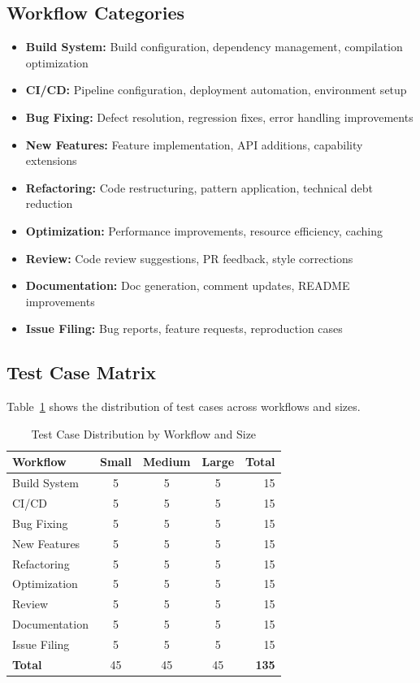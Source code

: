 \documentclass[11pt]{article}
\begin{document}
\subsection{Workflow Categories}
\begin{itemize}
    \item \textbf{Build System:} Build configuration, dependency management, compilation optimization
    \item \textbf{CI/CD:} Pipeline configuration, deployment automation, environment setup
    \item \textbf{Bug Fixing:} Defect resolution, regression fixes, error handling improvements
    \item \textbf{New Features:} Feature implementation, API additions, capability extensions
    \item \textbf{Refactoring:} Code restructuring, pattern application, technical debt reduction
    \item \textbf{Optimization:} Performance improvements, resource efficiency, caching
    \item \textbf{Review:} Code review suggestions, PR feedback, style corrections
    \item \textbf{Documentation:} Doc generation, comment updates, README improvements
    \item \textbf{Issue Filing:} Bug reports, feature requests, reproduction cases
\end{itemize}

\subsection{Test Case Matrix}
Table~\ref{tab:test-matrix} shows the distribution of test cases across workflows and sizes.

\begin{table}[H]
\centering
\caption{Test Case Distribution by Workflow and Size}
\label{tab:test-matrix}
\begin{tabular}{lcccr}
\toprule
\textbf{Workflow} & \textbf{Small} & \textbf{Medium} & \textbf{Large} & \textbf{Total} \\
\midrule
Build System & 5 & 5 & 5 & 15 \\
CI/CD & 5 & 5 & 5 & 15 \\
Bug Fixing & 5 & 5 & 5 & 15 \\
New Features & 5 & 5 & 5 & 15 \\
Refactoring & 5 & 5 & 5 & 15 \\
Optimization & 5 & 5 & 5 & 15 \\
Review & 5 & 5 & 5 & 15 \\
Documentation & 5 & 5 & 5 & 15 \\
Issue Filing & 5 & 5 & 5 & 15 \\
\midrule
\textbf{Total} & 45 & 45 & 45 & \textbf{135} \\
\bottomrule
\end{tabular}
\end{table}
\end{document}
